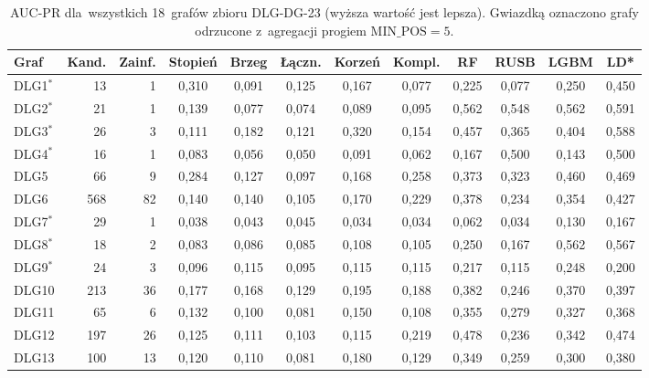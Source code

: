 \begin{table}[ht]
\centering
\caption{AUC-PR dla~wszystkich 18~grafów zbioru DLG-DG-23 (wyższa wartość jest lepsza). Gwiazdką oznaczono grafy odrzucone z~agregacji progiem $\mathrm{MIN\_POS} = 5$.}
\label{tab:dodb-auc-pr}
\footnotesize
\setlength{\tabcolsep}{3.5pt}
\begin{tabular}{lrrccccccccc}
\toprule
\textbf{Graf} & \textbf{Kand.} & \textbf{Zainf.} & \textbf{Stopień} & \textbf{Brzeg} & \textbf{Łączn.} & \textbf{Korzeń} & \textbf{Kompl.} & \textbf{RF} & \textbf{RUSB} & \textbf{LGBM} & \textbf{LD*} \\
\midrule
DLG1$^{*}$ & 13 & 1 & 0{,}310 & 0{,}091 & 0{,}125 & 0{,}167 & 0{,}077 & 0{,}225 & 0{,}077 & 0{,}250 & 0{,}450 \\
DLG2$^{*}$ & 21 & 1 & 0{,}139 & 0{,}077 & 0{,}074 & 0{,}089 & 0{,}095 & 0{,}562 & 0{,}548 & 0{,}562 & 0{,}591 \\
DLG3$^{*}$ & 26 & 3 & 0{,}111 & 0{,}182 & 0{,}121 & 0{,}320 & 0{,}154 & 0{,}457 & 0{,}365 & 0{,}404 & 0{,}588 \\
DLG4$^{*}$ & 16 & 1 & 0{,}083 & 0{,}056 & 0{,}050 & 0{,}091 & 0{,}062 & 0{,}167 & 0{,}500 & 0{,}143 & 0{,}500 \\
DLG5 & 66 & 9 & 0{,}284 & 0{,}127 & 0{,}097 & 0{,}168 & 0{,}258 & 0{,}373 & 0{,}323 & 0{,}460 & 0{,}469 \\
DLG6 & 568 & 82 & 0{,}140 & 0{,}140 & 0{,}105 & 0{,}170 & 0{,}229 & 0{,}378 & 0{,}234 & 0{,}354 & 0{,}427 \\
DLG7$^{*}$ & 29 & 1 & 0{,}038 & 0{,}043 & 0{,}045 & 0{,}034 & 0{,}034 & 0{,}062 & 0{,}034 & 0{,}130 & 0{,}167 \\
DLG8$^{*}$ & 18 & 2 & 0{,}083 & 0{,}086 & 0{,}085 & 0{,}108 & 0{,}105 & 0{,}250 & 0{,}167 & 0{,}562 & 0{,}567 \\
DLG9$^{*}$ & 24 & 3 & 0{,}096 & 0{,}115 & 0{,}095 & 0{,}115 & 0{,}115 & 0{,}217 & 0{,}115 & 0{,}248 & 0{,}200 \\
DLG10 & 213 & 36 & 0{,}177 & 0{,}168 & 0{,}129 & 0{,}195 & 0{,}188 & 0{,}382 & 0{,}246 & 0{,}370 & 0{,}397 \\
DLG11 & 65 & 6 & 0{,}132 & 0{,}100 & 0{,}081 & 0{,}150 & 0{,}108 & 0{,}355 & 0{,}279 & 0{,}327 & 0{,}368 \\
DLG12 & 197 & 26 & 0{,}125 & 0{,}111 & 0{,}103 & 0{,}115 & 0{,}219 & 0{,}478 & 0{,}236 & 0{,}342 & 0{,}474 \\
DLG13 & 100 & 13 & 0{,}120 & 0{,}110 & 0{,}081 & 0{,}180 & 0{,}129 & 0{,}349 & 0{,}259 & 0{,}300 & 0{,}380 \\

\end{tabular}
\end{table}
